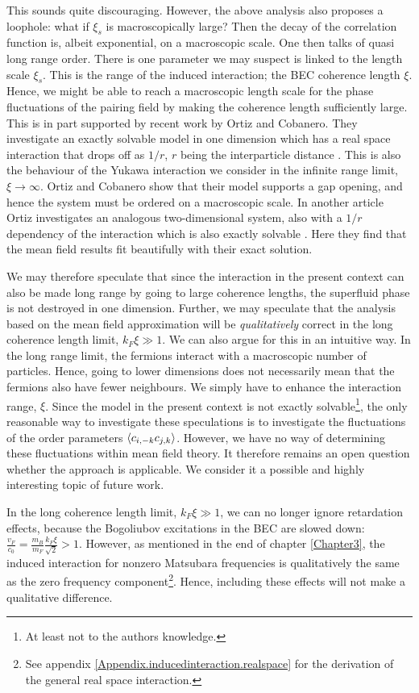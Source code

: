 This sounds quite discouraging. However, the above analysis also proposes a loophole: what if $\xi_s$ is macroscopically large? Then the decay of the correlation function is, albeit exponential, on a macroscopic scale. One then talks of quasi long range order. There is one parameter we may suspect is linked to the length scale $\xi_s$. This is the range of the induced interaction; the BEC coherence length $\xi$. Hence, we might be able to reach a macroscopic length scale for the phase fluctuations of the pairing field by making the coherence length sufficiently large. This is in part supported by recent work by Ortiz and Cobanero. They investigate an exactly solvable model in one dimension which has a real space interaction that drops off as $1 / r$, $r$ being the interparticle distance \cite{Ortiz.Beyondmeanfieldtheory}. This is also the behaviour of the Yukawa interaction we consider in the infinite range limit, $\xi \to \infty$. Ortiz and Cobanero show that their model supports a gap opening, and hence the system must be ordered on a macroscopic scale. In another article Ortiz investigates an analogous two-dimensional system, also with a $1 / r$ dependency of the interaction which is also exactly solvable \cite{Ortiz.pxpy}. Here they find that the mean field results fit beautifully with their exact solution.

We may therefore speculate that since the interaction in the present context can also be made long range by going to large coherence lengths, the superfluid phase is not destroyed in one dimension. Further, we may speculate that the analysis based on the mean field approximation will be \textit{qualitatively} correct in the long coherence length limit, $k_F\xi \gg 1$. We can also argue for this in an intuitive way. In the long range limit, the fermions interact with a macroscopic number of particles. Hence, going to lower dimensions does not necessarily mean that the fermions also have fewer neighbours. We simply have to enhance the interaction range, $\xi$. Since the model in the present context is not exactly solvable\footnote{At least not to the authors knowledge.}, the only reasonable way to investigate these speculations is to investigate the fluctuations of the order parameters $\braket{c_{i,-k}c_{j,k}}$. However, we have no way of determining these fluctuations within mean field theory. It therefore remains an open question whether the approach is applicable. We consider it a possible and highly interesting topic of future work. 

In the long coherence length limit, $k_F\xi \gg 1$, we can no longer ignore retardation effects, because the Bogoliubov excitations in the BEC are slowed down: $\frac{v_F}{c_0} = \frac{m_B}{m_F}\frac{k_F\xi}{\sqrt{2}} > 1$. However, as mentioned in the end of chapter \ref{Chapter3}, the induced interaction for nonzero Matsubara frequencies is qualitatively the same as the zero frequency component\footnote{See appendix \ref{Appendix.inducedinteraction.realspace} for the derivation of the general real space interaction.}. Hence, including these effects will not make a qualitative difference.

